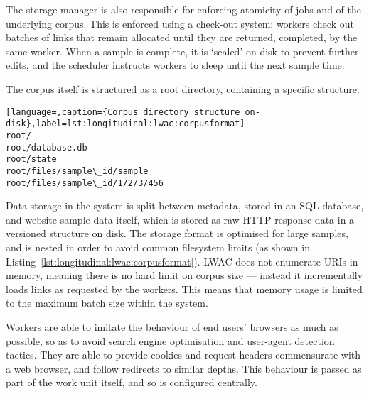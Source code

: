 The storage manager is also responsible for enforcing atomicity of jobs and of the underlying corpus.  This is enforced using a check-out system: workers check out batches of links that remain allocated until they are returned, completed, by the same worker.  When a sample is complete, it is `sealed' on disk to prevent further edits, and the scheduler instructs workers to sleep until the next sample time.


The corpus itself is structured as a root directory, containing a specific structure:

\begin{lstlisting}[language=,caption={Corpus directory structure on-disk},label=lst:longitudinal:lwac:corpusformat]
root/
root/database.db
root/state
root/files/sample\_id/sample
root/files/sample\_id/1/2/3/456
\end{lstlisting}



Data storage in the system is split between metadata, stored in an SQL database, and website sample data itself, which is stored as raw HTTP response data in a versioned structure on disk.  The storage format is optimised for large samples, and is nested in order to avoid common filesystem limits (as shown in Listing~\ref{lst:longitudinal:lwac:corpusformat}).  LWAC does not enumerate URIs in memory, meaning there is no hard limit on corpus size --- instead it incrementally loads links as requested by the workers.  This means that memory usage is limited to the maximum batch size within the system.

Workers are able to imitate the behaviour of end users' browsers as much as possible, so as to avoid search engine optimisation and user-agent detection tactics.  They are able to provide cookies and request headers commensurate with a web browser, and follow redirects to similar depths.  This behaviour is passed as part of the work unit itself, and so is configured centrally.


